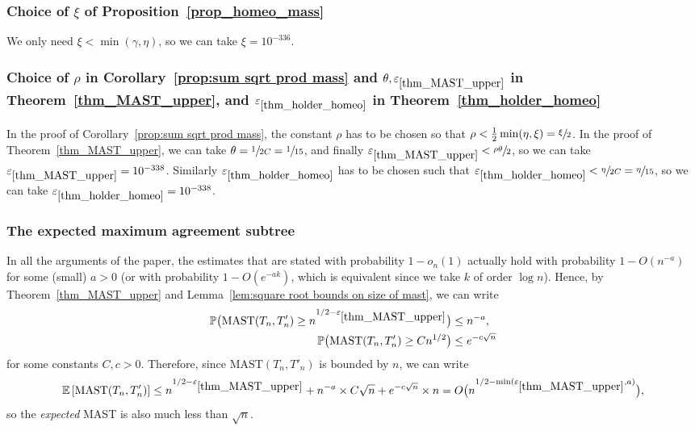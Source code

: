 \documentclass[JEP,XML,SOM,Unicode,NoFloatCountersInSection,published]{cedram}
\newcommand{\Ec}[1]{\mathbb{E} \left[#1\right]}
\newcommand{\bPp}[1]{\mathbb{P} \bigl(#1\bigr)}
\newcommand{\MAST}{\mathrm{MAST}}
\let\eps\varepsilon
\theoremstyle{plain}
\theoremstyle{definition}
\begin{document}
\subsubsection*{Choice of $\xi$ of Proposition~\ref{prop_homeo_mass}}
We only need $\xi < \min(\gamma,\eta)$, so we can take $\xi = 10^{-336}$.
\subsubsection*{Choice of $\rho$ in Corollary~\ref{prop:sum sqrt prod mass} and $\theta, \eps_{\ref{thm_MAST_upper}}$ in Theorem~\ref{thm_MAST_upper}, and $\eps_{\ref{thm_holder_homeo}}$ in Theorem~\ref{thm_holder_homeo}}
In the proof of Corollary~\ref{prop:sum sqrt prod mass}, the constant $\rho$ has to be chosen so that $\rho < \frac{1}{2}\min(\eta,\xi)=\sfrac{\xi}{2}$. In the proof of Theorem~\ref{thm_MAST_upper}, we can take $\theta=\sfrac{1}{2C}=\sfrac{1}{15}$, and finally $\eps_{\ref{thm_MAST_upper}}< \sfrac{\rho\theta}{2}$, so we can take $\eps_{\ref{thm_MAST_upper}}=10^{-338}$.
Similarly $\eps_{\ref{thm_holder_homeo}}$ has to be chosen such that $\eps_{\ref{thm_holder_homeo}} < \sfrac{\eta}{2C}=\sfrac{\eta}{15}$, so we can take $\eps_{\ref{thm_holder_homeo}}=10^{-338}$.

\label{subsec:discussion}

\subsubsection*{The expected maximum agreement subtree}
In all the arguments of the paper, the estimates that are stated with probability $1-o_n(1)$ actually hold with probability $1-O(n^{-a})$ for some (small) $a>0$ (or with probability $1-O(e^{-ak})$, which is equivalent since we take $k$ of order $\log n$). Hence, by Theorem~\ref{thm_MAST_upper} and Lemma~\ref{lem:square root bounds on size of mast}, we can write
\begin{align*}
\bPp{\MAST(T_n,T'_n) \geq n^{1/2-\eps_{\ref{thm_MAST_upper}}}} &\leq n^{-a},\\
\bPp{\MAST(T_n,T'_n) \geq Cn^{1/2}} &\leq e^{-c\sqrt{n}}
\end{align*}
for some constants $C,c>0$. Therefore, since $\MAST(T_n,T'_n)$ is bounded by $n$, we can write
\[ \Ec{\MAST(T_n,T'_n)} \leq n^{1/2-\eps_{\ref{thm_MAST_upper}}} + n^{-a} \times C\sqrt{n} + e^{-c\sqrt{n}} \times n = O \bigl( n^{1/2-\min(\eps_{\ref{thm_MAST_upper}},a)} \bigr),\]
so the \emph{expected} MAST is also much less than $\sqrt{n}$.
\end{document}
